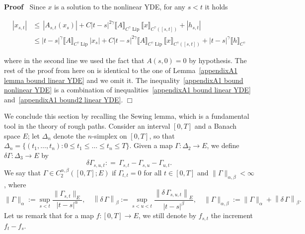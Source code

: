 \documentclass[10pt]{article}
\newcommand{\assign}{:=}
\newcommand{\tmop}[1]{\ensuremath{\operatorname{#1}}}
\newenvironment{proof}{\noindent\textbf{Proof\ }}{\hspace*{\fill}$\Box$\medskip}
\begin{document}
\begin{proof}
  Since $x$ is a solution to the nonlinear YDE, for any $s < t$ it holds
  
  \begin{align}
    | x_{s, t} | & \leqslant \, | A_{s, t} (x_s) | + C | t - s |^{2 \gamma}
    \llbracket A \rrbracket_{C^{\gamma} \tmop{Lip}} \llbracket x
    \rrbracket_{C^{\gamma} ([s, t])} + | h_{s, t} |\\
    & \leqslant | t - s |^{\gamma} \llbracket A \rrbracket_{C^{\gamma}
    \tmop{Lip}} | x_s | + C | t - s |^{2 \gamma} \llbracket A
    \rrbracket_{C^{\gamma} \tmop{Lip}} \llbracket x \rrbracket_{C^{\gamma}
    ([s, t])} + | t - s |^{\gamma} \llbracket h \rrbracket_{C^{\gamma}}
  \end{align}
  
  where in the second line we used the fact that $A (s, 0) = 0$ by hypothesis.
  The rest of the proof from here on is identical to the one of
  Lemma~\ref{appendixA1 lemma bound linear YDE} and we omit it. The
  inequality~{\eqref{appendixA1 bound nonlinear YDE}} is a combination of
  inequalities~{\eqref{appendixA1 bound linear YDE}} and~{\eqref{appendixA1
  bound2 linear YDE}}.
\end{proof}

We conclude this section by recalling the Sewing lemma, which is a fundamental
tool in the theory of rough paths. Consider an interval $[0, T]$ and a Banach
space $E$; let $\Delta_n$ denote the $n$\mbox{-}simplex on $[0, T]$, so that
$\Delta_n = \{ (t_1, \ldots, t_n) : 0 \leqslant t_1 \leqslant \ldots \leqslant
t_n \leqslant T \}$. Given a map $\Gamma : \Delta_2 \rightarrow E$, we define
$\delta \Gamma : \Delta_3 \rightarrow E$ by
\[ \delta \Gamma_{s, u, t} : = \, \Gamma_{s, t} - \Gamma_{s, u} - \Gamma_{u,
   t} . \]
We say that $\Gamma \in C^{\alpha, \beta}_2 ([0, T] ; E)$ if $\Gamma_{t, t} =
0$ for all $t \in [0, T]$ and $\| \Gamma \|_{\alpha, \beta} < \infty$, where
\[ \| \Gamma \|_{\alpha} \assign \sup_{s < t} \frac{\| \Gamma_{s, t} \|_E}{| t
   - s |^{\alpha}}, \quad \left\| \delta \, \Gamma \right\|_{\beta} \assign
   \sup_{s < u < t} \frac{\left\| \delta \, \Gamma_{s, u, t} \right\|_E}{| t -
   s |^{\beta}}, \quad \| \Gamma \|_{\alpha, \beta} \assign \| \Gamma
   \|_{\alpha} + \left\| \delta \, \Gamma \right\|_{\beta} . \]
Let us remark that for a map $f : [0, T] \rightarrow E$, we still denote by
$f_{s, t}$ the increment $f_t - f_s$.
\end{document}
